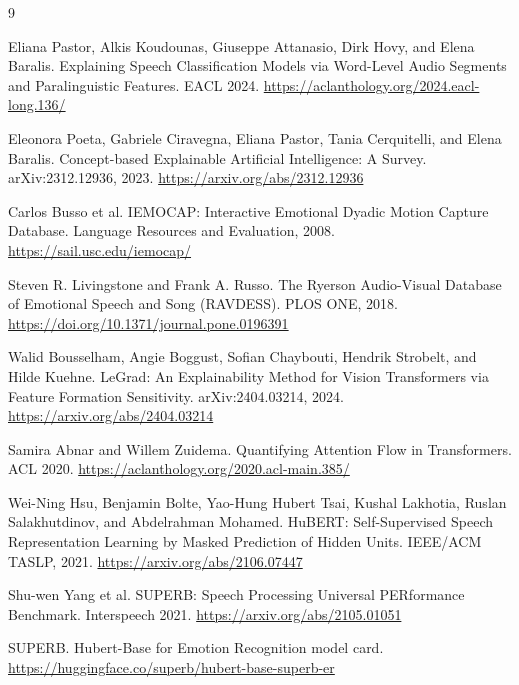 \documentclass[10pt]{article}
\begin{document}
\begin{thebibliography}{9}
\fontsize{6}{6.4}\selectfont
\setlength{\itemsep}{0pt}
\setlength{\parskip}{0pt}

Eliana Pastor, Alkis Koudounas, Giuseppe Attanasio, Dirk Hovy, and Elena Baralis.
\newblock Explaining Speech Classification Models via Word-Level Audio Segments and Paralinguistic Features.
\newblock EACL 2024.
\newblock \url{https://aclanthology.org/2024.eacl-long.136/}

Eleonora Poeta, Gabriele Ciravegna, Eliana Pastor, Tania Cerquitelli, and Elena Baralis.
\newblock Concept-based Explainable Artificial Intelligence: A Survey.
\newblock arXiv:2312.12936, 2023.
\newblock \url{https://arxiv.org/abs/2312.12936}

Carlos Busso et al.
\newblock IEMOCAP: Interactive Emotional Dyadic Motion Capture Database.
\newblock Language Resources and Evaluation, 2008.
\newblock \url{https://sail.usc.edu/iemocap/}

Steven R. Livingstone and Frank A. Russo.
\newblock The Ryerson Audio-Visual Database of Emotional Speech and Song (RAVDESS).
\newblock PLOS ONE, 2018.
\newblock \url{https://doi.org/10.1371/journal.pone.0196391}

Walid Bousselham, Angie Boggust, Sofian Chaybouti, Hendrik Strobelt, and Hilde Kuehne.
\newblock LeGrad: An Explainability Method for Vision Transformers via Feature Formation Sensitivity.
\newblock arXiv:2404.03214, 2024.
\newblock \url{https://arxiv.org/abs/2404.03214}

Samira Abnar and Willem Zuidema.
\newblock Quantifying Attention Flow in Transformers.
\newblock ACL 2020.
\newblock \url{https://aclanthology.org/2020.acl-main.385/}

Wei-Ning Hsu, Benjamin Bolte, Yao-Hung Hubert Tsai, Kushal Lakhotia, Ruslan Salakhutdinov, and Abdelrahman Mohamed.
\newblock HuBERT: Self-Supervised Speech Representation Learning by Masked Prediction of Hidden Units.
\newblock IEEE/ACM TASLP, 2021.
\newblock \url{https://arxiv.org/abs/2106.07447}

Shu-wen Yang et al.
\newblock SUPERB: Speech Processing Universal PERformance Benchmark.
\newblock Interspeech 2021.
\newblock \url{https://arxiv.org/abs/2105.01051}

SUPERB.
\newblock Hubert-Base for Emotion Recognition model card.
\newblock \url{https://huggingface.co/superb/hubert-base-superb-er}

\end{thebibliography}
\end{document}
